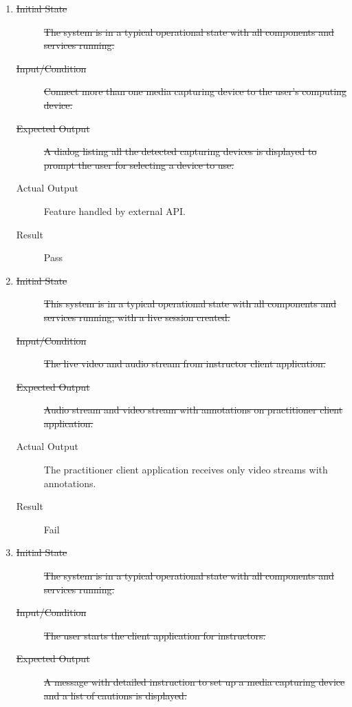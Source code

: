 \documentclass[12pt, titlepage]{article}
\begin{document}
\begin{enumerate}[NFR-T1]
  \item \label{NFRT13}
    \begin{description}
    \item[\sout{Initial State}]\sout{ The system is in a typical operational state with all
      components and services running.
    }
		\item[\sout{Input/Condition}]\sout{ Connect more than one media capturing device to the
      user’s computing device.
    }
		\item[\sout{Expected Output}]\sout{ A dialog listing all the detected capturing devices is
      displayed to prompt the user for selecting a device to use.
    }
		\item[Actual Output] Feature handled by external API.
    \item[Result] Pass
    \end{description}
  \item \label{NFRT14}
    \begin{description}
    \item[\sout{Initial State}]\sout{ This system is in a typical operational state with all
      components and services running, with a live session created.
    }
		\item[\sout{Input/Condition}]\sout{ The live video and audio stream from instructor client
      application.
    }
		\item[\sout{Expected Output}]\sout{ Audio stream and video stream with annotations on
      practitioner client application.
    }
		\item[Actual Output] The practitioner client application receives only video
      streams with annotations.
    \item[Result] Fail
    \end{description}
  \item \label{NFRT15}
    \begin{description}
    \item[\sout{Initial State}]\sout{ The system is in a typical operational state with all
      components and services running.
    }
		\item[\sout{Input/Condition}]\sout{ The user starts the client application for instructors.
    }
		\item[\sout{Expected Output}]\sout{ A message with detailed instruction to set up a media
      capturing device and a list of cautions is displayed.
}
\end{description}
\end{enumerate}
\end{document}
